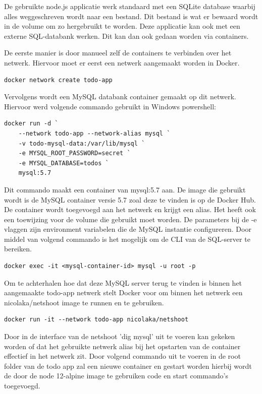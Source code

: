 De gebruikte node.js applicatie werk standaard met een SQLite database waarbij alles weggeschreven wordt naar een bestand. Dit bestand is wat er bewaard wordt in de volume om zo hergebruikt te worden. Deze applicatie kan ook met een externe SQL-databank werken. Dit kan dan ook gedaan worden via containers.

De eerste manier is door manueel zelf de containers te verbinden over het netwerk. Hiervoor moet er eerst een netwerk aangemaakt worden in Docker.
\begin{verbatim}
docker network create todo-app
\end{verbatim}
Vervolgens wordt een MySQL databank container gemaakt op dit netwerk. Hiervoor werd volgende commando gebruikt in Windows powershell:
\begin{lstlisting}
docker run -d `
    --network todo-app --network-alias mysql `
    -v todo-mysql-data:/var/lib/mysql `
    -e MYSQL_ROOT_PASSWORD=secret `
    -e MYSQL_DATABASE=todos `
    mysql:5.7
\end{lstlisting}
Dit commando maakt een container van mysql:5.7 aan. De image die gebruikt wordt is de MySQL container versie 5.7 zoal deze te vinden is op de Docker Hub. De container wordt toegevoegd aan het netwerk en krijgt een alias. Het heeft ook een toewijzing voor de volume die gebruikt moet worden. De parameters bij de -e vlaggen zijn environment variabelen die de MySQL instantie configureren. Door middel van volgend commando is het mogelijk om de CLI van de SQL-server te bereiken.

\begin{verbatim}
docker exec -it <mysql-container-id> mysql -u root -p
\end{verbatim}
Om te achterhalen hoe dat deze MySQL server terug te vinden is binnen het aangemaakte todo-app netwerk stelt Docker voor om binnen het netwerk een nicolaka/netshoot image te runnen en te gebruiken.
\begin{verbatim}
docker run -it --network todo-app nicolaka/netshoot
\end{verbatim}
Door in de interface van de netshoot 'dig mysql' uit te voeren kan gekeken worden of dat het gebruikte netwerk alias bij het opstarten van de container effectief in het netwerk zit. Door volgend commando uit te voeren in de root folder van de todo app zal een nieuwe container en gestart worden hierbij wordt de door de node 12-alpine image te gebruiken code en start commando's toegevoegd.

